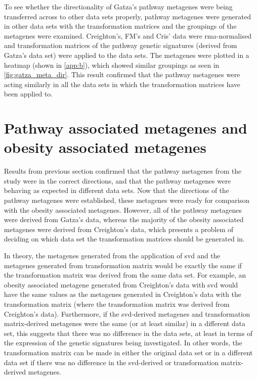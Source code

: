 To see whether the directionality of Gatza's pathway metagenes were being transferred across to other data sets properly, pathway metagenes were generated in other data sets with the transformation matrices and the groupings of the metagenes were examined.
Creighton's, FM's and Cris' data were \gls{rma}-normalised and transformation matrices of the pathway genetic signatures (derived from Gatza's data set) were applied to the data sets.
The metagenes were plotted in a heatmap (shown in \cref{app:b}), which showed similar groupings  as seen in \cref{fig:gatza_meta_dir}.
This result confirmed that the pathway metagenes were acting similarly in all the data sets in which the transformation matrices have been applied to.


\section{Pathway associated metagenes and obesity associated metagenes}
\label{sec:pathway_associated_metagenes_and_obesity_associated_metagenes}

Results from previous section confirmed that the pathway metagenes from the \citet{Gatza2010a} study were in the correct directions, and that the pathway metagenes were behaving as expected in different data sets.
Now that the directions of the pathway metagenes were established, these metagenes were ready for comparison with the obesity associated metagenes.
However, all of the pathway metagenes were derived from Gatza's data, whereas the majority of the obesity associated metagenes were derived from Creighton's data, which presents a problem of deciding on which data set the transformation matrices should be generated in.

In theory, the metagenes generated from the application of \gls{svd} and the metagenes generated from transformation matrix would be exactly the same if the transformation matrix was derived from the same data set.
For example, an obesity associated metagene generated from Creighton's data with \gls{svd} would have the same values as the metagenes generated in Creighton's data with the transformation matrix (where the transformation matrix was derived from Creighton's data).
Furthermore, if the \gls{svd}-derived metagenes and transformation matrix-derived metagenes were the same (or at least similar) in a different data set, this suggests that there was no difference in the data sets, at least in terms of the expression of the genetic signatures being investigated.
In other words, the transformation matrix can be made in either the original data set or in a different data set if there was no difference in the \gls{svd}-derived or transformation matrix-derived metagenes.

